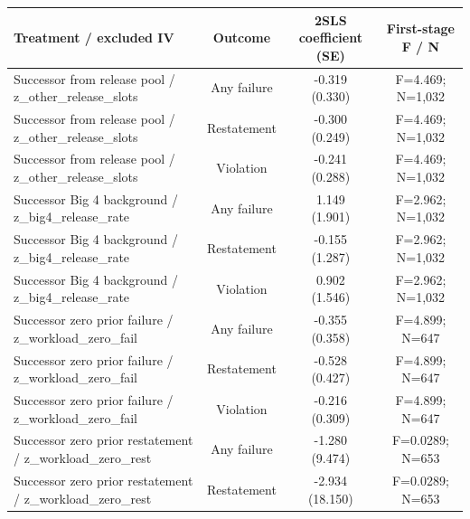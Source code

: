 \documentclass[10pt]{article}
\begin{document}
\begin{minipage}{19cm}\fontsize{10}{12}\selectfont\setlength{\tabcolsep}{4pt}\renewcommand{\arraystretch}{1.12}


\centering
{}
\begin{threeparttable}
\begin{tabular}{p{}ccc}
\toprule
Treatment / excluded IV & Outcome & 2SLS coefficient (SE) & First-stage F / N \\
\midrule
Successor from release pool / z\_other\_release\_slots & Any failure & \shortstack{-0.319\\(0.330)} & F=4.469; N=1,032 \\
Successor from release pool / z\_other\_release\_slots & Restatement & \shortstack{-0.300\\(0.249)} & F=4.469; N=1,032 \\
Successor from release pool / z\_other\_release\_slots & Violation & \shortstack{-0.241\\(0.288)} & F=4.469; N=1,032 \\
Successor Big 4 background / z\_big4\_release\_rate & Any failure & \shortstack{1.149\\(1.901)} & F=2.962; N=1,032 \\
Successor Big 4 background / z\_big4\_release\_rate & Restatement & \shortstack{-0.155\\(1.287)} & F=2.962; N=1,032 \\
Successor Big 4 background / z\_big4\_release\_rate & Violation & \shortstack{0.902\\(1.546)} & F=2.962; N=1,032 \\
Successor zero prior failure / z\_workload\_zero\_fail & Any failure & \shortstack{-0.355\\(0.358)} & F=4.899; N=647 \\
Successor zero prior failure / z\_workload\_zero\_fail & Restatement & \shortstack{-0.528\\(0.427)} & F=4.899; N=647 \\
Successor zero prior failure / z\_workload\_zero\_fail & Violation & \shortstack{-0.216\\(0.309)} & F=4.899; N=647 \\
Successor zero prior restatement / z\_workload\_zero\_rest & Any failure & \shortstack{-1.280\\(9.474)} & F=0.0289; N=653 \\
Successor zero prior restatement / z\_workload\_zero\_rest & Restatement & \shortstack{-2.934\\(18.150)} & F=0.0289; N=653 \\

\end{tabular}
\end{threeparttable}
\end{minipage}
\end{document}
